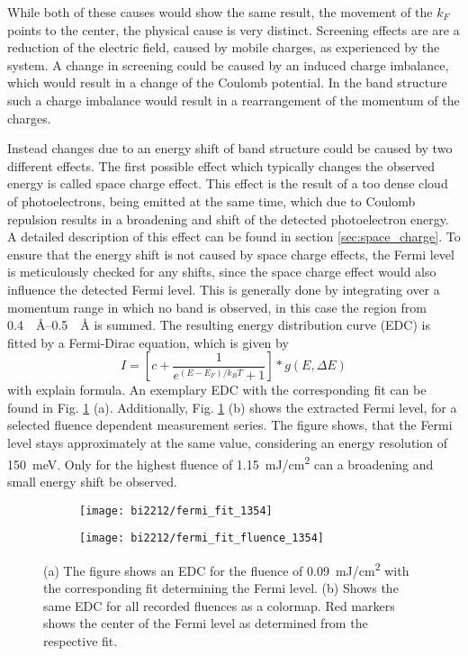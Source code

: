 While both of these causes would show the same result, the movement of the $k_F$ points to the center, the physical cause is very distinct.
Screening effects are are a reduction of the electric field, caused by mobile charges, as experienced by the system.
A change in screening could be caused by an induced charge imbalance, which would result in a change of the Coulomb potential.
In the band structure such a charge imbalance would result in a rearrangement of the momentum of the charges.

Instead changes due to an energy shift of band structure could be caused by two different effects.
The first possible effect which typically changes the observed energy is called space charge effect.
This effect is the result of a too dense cloud of photoelectrons, being emitted at the same time, which due to Coulomb repulsion results in a broadening and shift of the detected photoelectron energy.
A detailed description of this effect can be found in section \ref{sec:space_charge}.
To ensure that the energy shift is not caused by space charge effects, the Fermi level is meticulously checked for any shifts, since the space charge effect would also influence the detected Fermi level.
This is generally done by integrating over a momentum range in which no band is observed, in this case the region from \qtyrange{0.4}{0.5}{\per\angstrom} is summed.
The resulting energy distribution curve (EDC) is fitted by a Fermi-Dirac equation, which is given by
\begin{equation}
	I = \left[ c + \frac{1}{e^{(E-E_F)/k_BT}+1} \right] * g(E,\Delta E)
\end{equation}
with explain formula.
An exemplary EDC with the corresponding fit can be found in Fig. \ref{fig:fermi_fit_bi2212} (a).
Additionally, Fig. \ref{fig:fermi_fit_bi2212} (b) shows the extracted Fermi level, for a selected fluence dependent measurement series.
The figure shows, that the Fermi level stays approximately at the same value, considering an energy resolution of \qty{150}{\milli\electronvolt}.
Only for the highest fluence of \qty{1.15}{\milli\joule/\centi\meter\squared} can a broadening and small energy shift be observed.

\begin{figure}[t]
	\centering
	\begin{subfigure}[b]{0.33\textwidth}
		\texttt{[image: bi2212/fermi\_fit\_1354]}
		\caption{}
	\end{subfigure}
	\begin{subfigure}[b]{0.33\textwidth}
		\texttt{[image: bi2212/fermi\_fit\_fluence\_1354]}
		\caption{}
	\end{subfigure}
	\caption{(a) The figure shows an EDC for the fluence of \qty{0.09}{\milli\joule/\centi\meter\squared} with the corresponding fit determining the Fermi level. (b) Shows the same EDC for all recorded fluences as a colormap. Red markers shows the center of the Fermi level as determined from the respective fit.}
	\label{fig:fermi_fit_bi2212}
\end{figure}

